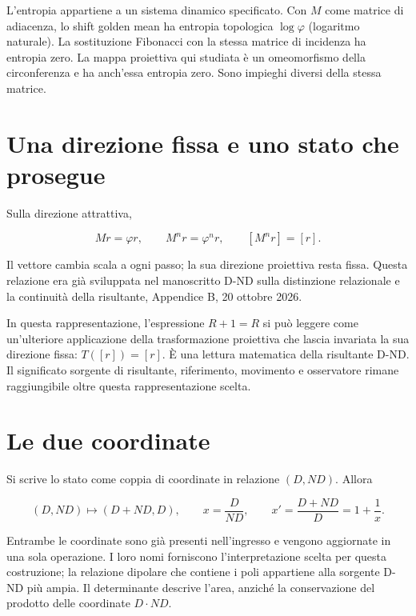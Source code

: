 \documentclass[10pt,a4paper]{article}
\begin{document}
L'entropia appartiene a un sistema dinamico specificato. Con $M$ come matrice di adiacenza, lo shift golden mean ha entropia topologica $\log\varphi$ (logaritmo naturale). La sostituzione Fibonacci con la stessa matrice di incidenza ha entropia zero. La mappa proiettiva qui studiata è un omeomorfismo della circonferenza e ha anch'essa entropia zero. Sono impieghi diversi della stessa matrice.
\par

\section*{Una direzione fissa e uno stato che prosegue}

Sulla direzione attrattiva,
\par

\[
Mr=\varphi r,\qquad M^nr=\varphi^nr,\qquad [M^nr]=[r].
\]

Il vettore cambia scala a ogni passo; la sua direzione proiettiva resta fissa. Questa relazione era già sviluppata nel manoscritto D-ND sulla distinzione relazionale e la continuità della risultante, Appendice B, 20 ottobre 2026.
\par

In questa rappresentazione, l'espressione $R+1=R$ si può leggere come un'ulteriore applicazione della trasformazione proiettiva che lascia invariata la sua direzione fissa: $T([r])=[r]$. È una lettura matematica della risultante D-ND. Il significato sorgente di risultante, riferimento, movimento e osservatore rimane raggiungibile oltre questa rappresentazione scelta.
\par

\section*{Le due coordinate}

Si scrive lo stato come coppia di coordinate in relazione $(D,ND)$. Allora
\par

\[
(D,ND)\longmapsto(D+ND,D),\qquad x=\frac D{ND},\qquad x'=\frac{D+ND}{D}=1+\frac1x.
\]

Entrambe le coordinate sono già presenti nell'ingresso e vengono aggiornate in una sola operazione. I loro nomi forniscono l'interpretazione scelta per questa costruzione; la relazione dipolare che contiene i poli appartiene alla sorgente D-ND più ampia. Il determinante descrive l'area, anziché la conservazione del prodotto delle coordinate $D\cdot ND$.
\par
\end{document}
